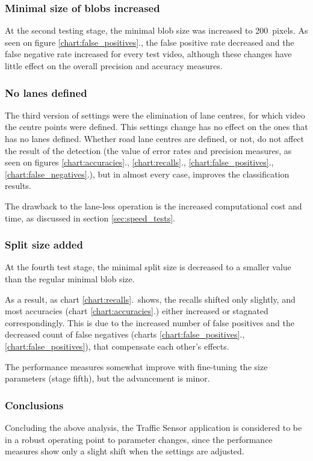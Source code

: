 \subsubsection{Minimal size of blobs increased}\label{sec:ver_2}
At the second testing stage, the minimal blob size was increased to \SI{200}{pixels}.
As seen on figure \ref{chart:false_positives}., the false positive rate decreased and the false negative rate increased for every test video, although these changes have little effect on the overall precision and accuracy measures.

\subsubsection{No lanes defined}\label{sec:ver_3}
The third version of settings were the elimination of lane centres, for which video the centre points were defined.
This settings change has no effect on the ones that has no lanes defined.
Whether road lane centres are defined, or not, do not affect the result of the detection (the value of error rates and precision measures, as seen on figures \ref{chart:accuracies}., \ref{chart:recalls}., \ref{chart:false_positives}., \ref{chart:false_negatives}.), but in almost every case, improves the classification results.

The drawback to the lane-less operation is the increased computational cost and time, as discussed in section \ref{sec:speed_tests}.

\subsubsection{Split size added}\label{sec:ver_4}
At the fourth test stage, the minimal split size is decreased to a smaller value than the regular minimal blob size.

As a result, as chart \ref{chart:recalls}.~shows, the recalls shifted only slightly, and most accuracies (chart \ref{chart:accuracies}.) either increased or stagnated correspondingly.
This is due to the increased number of false positives and the decreased count of false negatives (charts \ref{chart:false_positives}., \ref{chart:false_positives}), that compensate each other's effects.

The performance measures somewhat improve with fine-tuning the size parameters (stage fifth), but the advancement is minor.

\subsubsection{Conclusions}
Concluding the above analysis, the Traffic Sensor application is considered to be in a robust operating point to parameter changes, since the performance measures show only a slight shift when the settings are adjusted.


